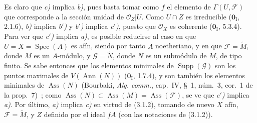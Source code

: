Es claro que \emph{c)} implica \emph{b)}, pues basta tomar como $f$ el elemento
de $\Gamma(U,\mathcal F)$ que corresponde a la sección unidad de
$\mathcal O_Z|U$. Como $U\cap Z$ es irreducible ($\mathbf{0}_{\mathrm I}$, 2.1.6),
\emph{b)} implica \emph{b$'$)} y \emph{b$'$)} implica \emph{c$'$)}, puesto que
$\mathcal O_X$ es coherente ($\mathbf{0}_{\mathrm I}$, 5.3.4). Para ver que
\emph{c$'$)} implica \emph{a)}, es posible reducirse al caso en que
$U=X=\operatorname{Spec}(A)$ es afín, siendo por tanto $A$ noetheriano, y en
que $\mathcal F=\widetilde M$, donde $M$ es un $A$-módulo, y
$\mathcal G=\widetilde N$, donde $N$ es un submódulo de $M$, de tipo finito.
Se sabe entonces que los elementos minimales de
$\operatorname{Supp}(\mathcal G)$ son los puntos maximales de
$V(\operatorname{Ann}(N))$ ($\mathbf{0}_{\mathrm I}$, 1.7.4), y son también los elementos
minimales de $\operatorname{Ass}(N)$ (Bourbaki, \emph{Alg. comm.}, cap.~IV,
\S~1, núm.~3, cor.~1 de la prop.~7)~; como
$\operatorname{Ass}(N)\subset\operatorname{Ass}(M)
=\operatorname{Ass}(\mathcal F)$, se ve que \emph{c$'$)} implica
\emph{a)}. Por último, \emph{a)} implica \emph{c)} en virtud de (3.1.2),
tomando de nuevo $X$ afín, $\mathcal F=\widetilde M$, y $Z$ definido por el
ideal $fA$ (con las notaciones de (3.1.2)).

